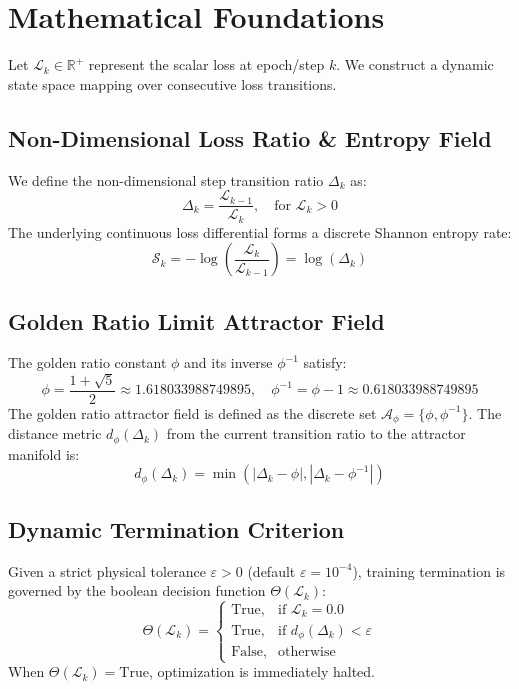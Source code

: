 \section{Mathematical Foundations}

Let $\mathcal{L}_k \in \mathbb{R}^+$ represent the scalar loss at epoch/step $k$. We construct a dynamic state space mapping over consecutive loss transitions.

\subsection{Non-Dimensional Loss Ratio & Entropy Field}
We define the non-dimensional step transition ratio $\Delta_k$ as:
\begin{equation}
\Delta_k = \frac{\mathcal{L}_{k-1}}{\mathcal{L}_k}, \quad \text{for } \mathcal{L}_k > 0
\end{equation}
The underlying continuous loss differential forms a discrete Shannon entropy rate:
\begin{equation}
\mathcal{S}_k = -\log\left( \frac{\mathcal{L}_k}{\mathcal{L}_{k-1}} \right) = \log(\Delta_k)
\end{equation}

\subsection{Golden Ratio Limit Attractor Field}
The golden ratio constant $\phi$ and its inverse $\phi^{-1}$ satisfy:
\begin{equation}
\phi = \frac{1 + \sqrt{5}}{2} \approx 1.618033988749895, \quad \phi^{-1} = \phi - 1 \approx 0.618033988749895
\end{equation}
The golden ratio attractor field is defined as the discrete set $\mathcal{A}_{\phi} = \{\phi, \phi^{-1}\}$. The distance metric $d_{\phi}(\Delta_k)$ from the current transition ratio to the attractor manifold is:
\begin{equation}
d_{\phi}(\Delta_k) = \min\left( |\Delta_k - \phi|, |\Delta_k - \phi^{-1}| \right)
\end{equation}

\subsection{Dynamic Termination Criterion}
Given a strict physical tolerance $\varepsilon > 0$ (default $\varepsilon = 10^{-4}$), training termination is governed by the boolean decision function $\Theta(\mathcal{L}_k)$:
\begin{equation}
\Theta(\mathcal{L}_k) = \begin{cases}
\text{True}, & \text{if } \mathcal{L}_k = 0.0 \\
\text{True}, & \text{if } d_{\phi}(\Delta_k) < \varepsilon \\
\text{False}, & \text{otherwise}
\end{cases}
\end{equation}
When $\Theta(\mathcal{L}_k) = \text{True}$, optimization is immediately halted.
